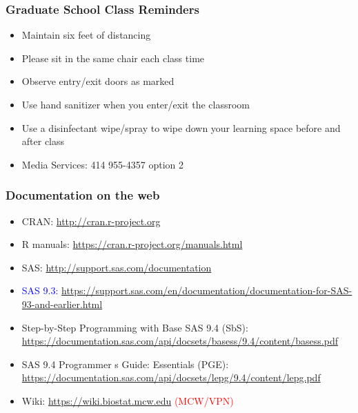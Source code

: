 \documentclass[11pt,pdftex,dvipsnames,usenames,helvetica]{beamer}
\begin{document}
\boldmath

\begin{frame}
\frametitle{Graduate School Class Reminders}

\begin{itemize}
\item Maintain six feet of distancing
\item Please sit in the same chair each class time
\item Observe entry/exit doors as marked
\item Use hand sanitizer when you enter/exit the classroom
\item Use a disinfectant wipe/spray to wipe down your learning space
  before and after class
\item Media Services: 414 955-4357 option 2
\end{itemize}

\end{frame}

\begin{frame}
\frametitle{Documentation on the web}

\begin{itemize}
\item CRAN: \url{http://cran.r-project.org}
\item R manuals: \url{https://cran.r-project.org/manuals.html}
\item SAS: \url{http://support.sas.com/documentation}
\item 
\textcolor{blue}{SAS 9.3: \url{https://support.sas.com/en/documentation/documentation-for-SAS-93-and-earlier.html}}
\item Step-by-Step Programming with Base SAS 9.4 (SbS): \\
\url{https://documentation.sas.com/api/docsets/basess/9.4/content/basess.pdf}
\item SAS 9.4 Programmer s Guide: Essentials (PGE): \\
\url{https://documentation.sas.com/api/docsets/lepg/9.4/content/lepg.pdf}
\item Wiki: \url{https://wiki.biostat.mcw.edu} 
\textcolor{red}{(MCW/VPN)}
\end{itemize}

\end{frame}
\end{document}
